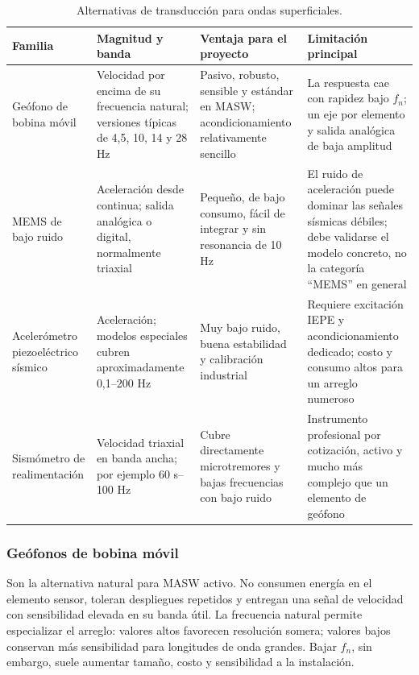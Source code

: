 \begin{table}[ht]
\centering
\footnotesize
\caption{Alternativas de transducción para ondas superficiales.}
\begin{tabularx}{\textwidth}{@{}>{\raggedright\arraybackslash}p{} >{\raggedright\arraybackslash}p{} Y Y@{}}
\toprule
\textbf{Familia} & \textbf{Magnitud y banda} & \textbf{Ventaja para el proyecto} & \textbf{Limitación principal} \\
\midrule
Geófono de bobina móvil & Velocidad por encima de su frecuencia natural; versiones típicas de 4,5, 10, 14 y 28 Hz & Pasivo, robusto, sensible y estándar en MASW; acondicionamiento relativamente sencillo & La respuesta cae con rapidez bajo $f_n$; un eje por elemento y salida analógica de baja amplitud \\
MEMS de bajo ruido & Aceleración desde continua; salida analógica o digital, normalmente triaxial & Pequeño, de bajo consumo, fácil de integrar y sin resonancia de 10 Hz & El ruido de aceleración puede dominar las señales sísmicas débiles; debe validarse el modelo concreto, no la categoría ``MEMS'' en general \\
Acelerómetro piezoeléctrico sísmico & Aceleración; modelos especiales cubren aproximadamente 0,1--200 Hz & Muy bajo ruido, buena estabilidad y calibración industrial & Requiere excitación IEPE y acondicionamiento dedicado; costo y consumo altos para un arreglo numeroso \\
Sismómetro de realimentación & Velocidad triaxial en banda ancha; por ejemplo 60 s--100 Hz & Cubre directamente microtremores y bajas frecuencias con bajo ruido & Instrumento profesional por cotización, activo y mucho más complejo que un elemento de geófono \\
\bottomrule
\end{tabularx}
\end{table}

\subsubsection{Geófonos de bobina móvil}

Son la alternativa natural para MASW activo. No consumen energía en el elemento sensor,
toleran despliegues repetidos y entregan una señal de velocidad con sensibilidad elevada
en su banda útil. La frecuencia natural permite especializar el arreglo: valores altos
favorecen resolución somera; valores bajos conservan más sensibilidad para longitudes de
onda grandes. Bajar $f_n$, sin embargo, suele aumentar tamaño, costo y sensibilidad a la
instalación.

